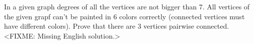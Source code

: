 \problem{}
In a given graph degrees of all the vertices are not bigger than 7.
All vertices of the given grapf can't be painted in 6 colors correctly
(connected vertices must have different colors).
Prove that there are 3 vertices pairwise connected.
\solution
<FIXME: Missing English solution.>
\endproblem
